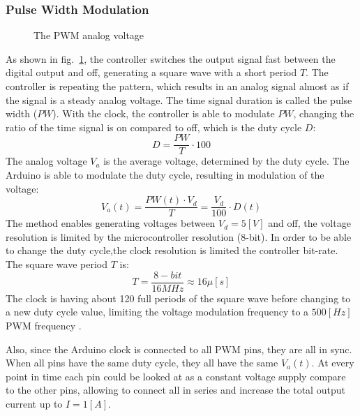 \documentclass[\main/master.tex]{subfiles}
\begin{document}
\subsubsection{Pulse Width Modulation}
\begin{figure}[htbp]
	\centering
	\caption[The PWM analog voltage]{The PWM analog voltage}
	\label{fig:duty_cycle}
\end{figure}
\FloatBarrier
\par\noindent
As shown in fig.~\ref{fig:duty_cycle}, the controller switches the output signal fast between the digital output and off, generating a square wave with a short period $T$. The controller is repeating the pattern, which results in an analog signal almost as if the signal is a steady analog voltage. The time signal duration is called the pulse width ($PW$). With the clock, the controller is able to modulate $PW$, changing the ratio of the time signal is on compared to off, which is the duty cycle $D$:
\begin{equation}
D = \frac{PW}{T}\cdot 100  \label{eqn:duty cycle}
\end{equation}
The analog voltage $V_a$ is the average voltage, determined by the duty cycle. The Arduino is able to modulate the duty cycle, resulting in modulation of the voltage:
\begin{equation}
V_a(t) = \frac{ PW(t)\cdot V_d}{ T}  = \frac{V_d}{100}\cdot D(t)   \label{eqn:analog voltage}
\end{equation}
The method enables generating voltages between $V_d = 5[V]$ and off, the voltage resolution is limited by the microcontroller resolution (8-bit). In order to be able to change the duty cycle,the clock resolution is limited the controller bit-rate. The square wave period $T$ is:
\begin{equation}
T = \frac{8-bit }{16MHz}  \approx 16\mu [s]	    \label{eqn:square wave frequency}
\end{equation}
The clock is having about 120 full periods of the square wave before changing to a new duty cycle value, limiting the voltage modulation frequency to a $500[Hz]$ PWM frequency . 
\par\noindent 
Also, since the Arduino clock is connected to all PWM pins, they are all in sync. When all pins have the same duty cycle, they all have the same $V_a(t)$. At every point in time each pin could be looked at as a constant voltage supply compare to the other pins, allowing to connect all in series and increase the total output current up to $I = 1[A]$. 
\end{document}

